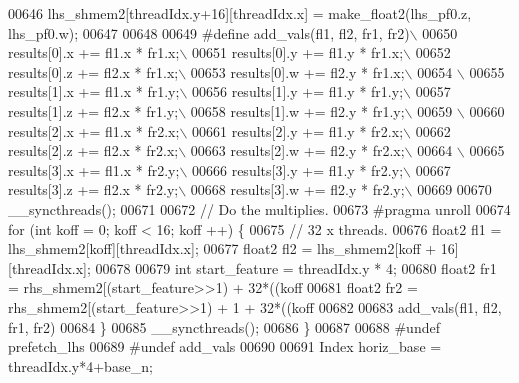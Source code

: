\begin{DoxyCode}
00646     lhs\_shmem2[threadIdx.y+16][threadIdx.x] = make\_float2(lhs\_pf0.z, lhs\_pf0.w);
00647 
00648 
00649 \textcolor{preprocessor}{#define add\_vals(fl1, fl2, fr1, fr2)\(\backslash\)}
00650 \textcolor{preprocessor}{    results[0].x += fl1.x * fr1.x;\(\backslash\)}
00651 \textcolor{preprocessor}{    results[0].y += fl1.y * fr1.x;\(\backslash\)}
00652 \textcolor{preprocessor}{    results[0].z += fl2.x * fr1.x;\(\backslash\)}
00653 \textcolor{preprocessor}{    results[0].w += fl2.y * fr1.x;\(\backslash\)}
00654 \textcolor{preprocessor}{\(\backslash\)}
00655 \textcolor{preprocessor}{    results[1].x += fl1.x * fr1.y;\(\backslash\)}
00656 \textcolor{preprocessor}{    results[1].y += fl1.y * fr1.y;\(\backslash\)}
00657 \textcolor{preprocessor}{    results[1].z += fl2.x * fr1.y;\(\backslash\)}
00658 \textcolor{preprocessor}{    results[1].w += fl2.y * fr1.y;\(\backslash\)}
00659 \textcolor{preprocessor}{\(\backslash\)}
00660 \textcolor{preprocessor}{    results[2].x += fl1.x * fr2.x;\(\backslash\)}
00661 \textcolor{preprocessor}{    results[2].y += fl1.y * fr2.x;\(\backslash\)}
00662 \textcolor{preprocessor}{    results[2].z += fl2.x * fr2.x;\(\backslash\)}
00663 \textcolor{preprocessor}{    results[2].w += fl2.y * fr2.x;\(\backslash\)}
00664 \textcolor{preprocessor}{\(\backslash\)}
00665 \textcolor{preprocessor}{    results[3].x += fl1.x * fr2.y;\(\backslash\)}
00666 \textcolor{preprocessor}{    results[3].y += fl1.y * fr2.y;\(\backslash\)}
00667 \textcolor{preprocessor}{    results[3].z += fl2.x * fr2.y;\(\backslash\)}
00668 \textcolor{preprocessor}{    results[3].w += fl2.y * fr2.y;\(\backslash\)}
00669 \textcolor{preprocessor}{}
00670     \_\_syncthreads();
00671 
00672     \textcolor{comment}{// Do the multiplies.}
00673 \textcolor{preprocessor}{    #pragma unroll}
00674     \textcolor{keywordflow}{for} (\textcolor{keywordtype}{int} koff = 0; koff < 16; koff ++) \{
00675       \textcolor{comment}{// 32 x threads.}
00676       float2 fl1 = lhs\_shmem2[koff][threadIdx.x];
00677       float2 fl2 = lhs\_shmem2[koff + 16][threadIdx.x];
00678 
00679       \textcolor{keywordtype}{int} start\_feature = threadIdx.y * 4;
00680       float2 fr1 = rhs\_shmem2[(start\_feature>>1) + 32*((koff%
00681       float2 fr2 = rhs\_shmem2[(start\_feature>>1) + 1 + 32*((koff%
00682 
00683       add\_vals(fl1, fl2, fr1, fr2)
00684     \}
00685     \_\_syncthreads();
00686   \}
00687 
00688 \textcolor{preprocessor}{#undef prefetch\_lhs}
00689 \textcolor{preprocessor}{#undef add\_vals}
00690 
00691   Index horiz\_base = threadIdx.y*4+base\_n;

\end{DoxyCode}
